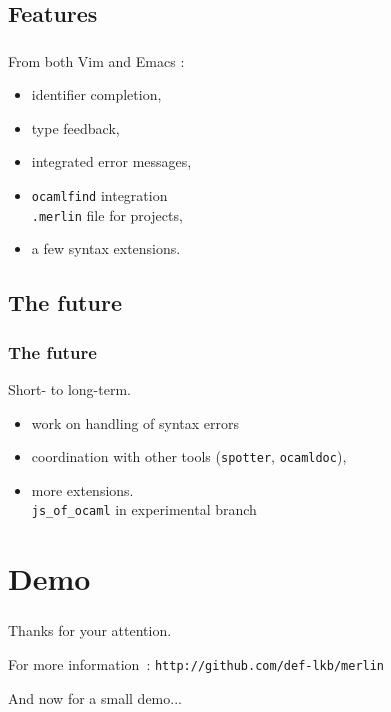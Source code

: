\documentclass{beamer}
\newcommand{\sectitle}{\frametitle{\insertsection}}
\begin{document}
\subsection{Features}

\begin{frame}
  \sectitle

  From both Vim and Emacs :

  \begin{itemize}
    \item identifier completion,
    \item type feedback,
    \item integrated error messages,
    \item \texttt{ocamlfind} integration \\
      {\small {\tt .merlin} file for projects},
    \item a few syntax extensions.
  \end{itemize}

\end{frame}

\subsection{The future}

\begin{frame}
  \frametitle{The future}

  Short- to long-term.

  \begin{itemize}
    \item work on handling of syntax errors
      \pause
    \item coordination with other tools (\texttt{spotter}, \texttt{ocamldoc}),
      \pause
    \item more extensions. \\
      {\small \texttt{js\_of\_ocaml} in experimental branch}
  \end{itemize}

\end{frame}

\section*{Demo}

\begin{frame}
 \sectitle
 
 Thanks for your attention.

 \vfill

 For more information : {\tt http://github.com/def-lkb/merlin} 

 \vfill

 And now for a small demo...
 
\end{frame}
\end{document}
